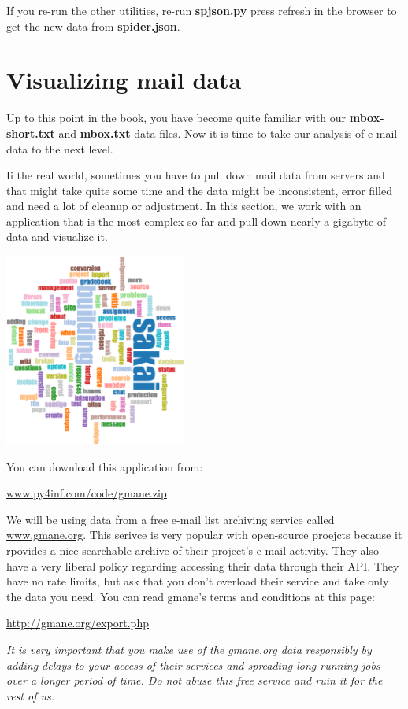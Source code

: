 \documentclass[11pt]{book}
\begin{document}
If you re-run the other utilities, re-run {\bf spjson.py} 
press refresh in the browser to get the new data from {\bf spider.json}.

\section{Visualizing mail data}

Up to this point in the book, you have become quite familiar with our 
{\bf mbox-short.txt} and {\bf mbox.txt} data files.   Now it is time to take
our analysis of e-mail data to the next level.  

Ii the real world, sometimes you have to pull down mail data from servers
and that might take quite some time and the data might be inconsistent, 
error filled and need a lot of cleanup or adjustment.  In this section, we
work with an application that is the most complex so far and pull down nearly a 
gigabyte of data and visualize it.

\beforefig
\centerline{\includegraphics[height=2.50in]{figs2/wordcloud.eps}}
\afterfig

You can download this application from:

\url{www.py4inf.com/code/gmane.zip}

We will be using data from a free e-mail list archiving service called 
\url{www.gmane.org}.  This serivce is very popular with open-source
proejcts because it rpovides a nice searchable archive of their project's
e-mail activity.  They also have a very liberal policy regarding accessing 
their data through their API.  They have no rate limits, but ask that you 
don't overload their service and take only the data you need.  You can read
gmane's terms and conditions at this page:

\url{http://gmane.org/export.php}

{\em It is very important that you make use of the gmane.org data
responsibly by adding delays to your access of their services and spreading
long-running jobs over a longer period of time.  Do not abuse this free service
and ruin it for the rest of us.}
\end{document}
